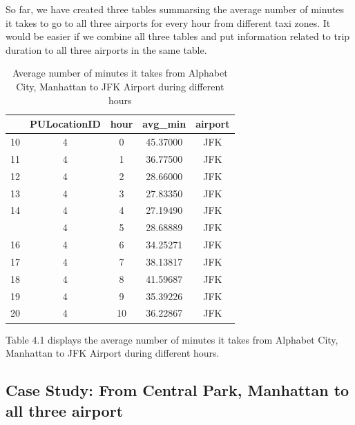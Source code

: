 \documentclass[12pt,twoside]{reedthesis}
\theoremstyle{definition}
\theoremstyle{definition}
\theoremstyle{definition}
\theoremstyle{remark}
\begin{document}
So far, we have created three tables summarsing the average number of
minutes it takes to go to all three airports for every hour from
different taxi zones. It would be easier if we combine all three tables
and put information related to trip duration to all three airports in
the same table.
\begin{table}

\caption{\label{tab:unnamed-chunk-58}Average number of minutes it takes from Alphabet City, Manhattan to JFK Airport during different hours}
\centering
\begin{tabular}[t]{lcccc}
\toprule
  & PULocationID & hour & avg\_min & airport\\
\midrule
10 & 4 & 0 & 45.37000 & JFK\\
11 & 4 & 1 & 36.77500 & JFK\\
12 & 4 & 2 & 28.66000 & JFK\\
13 & 4 & 3 & 27.83350 & JFK\\
14 & 4 & 4 & 27.19490 & JFK\\
\addlinespace
15 & 4 & 5 & 28.68889 & JFK\\
16 & 4 & 6 & 34.25271 & JFK\\
17 & 4 & 7 & 38.13817 & JFK\\
18 & 4 & 8 & 41.59687 & JFK\\
19 & 4 & 9 & 35.39226 & JFK\\
20 & 4 & 10 & 36.22867 & JFK\\
\bottomrule
\end{tabular}
\end{table}
Table 4.1 displays the average number of minutes it takes from Alphabet
City, Manhattan to JFK Airport during different hours.

\subsection{Case Study: From Central Park, Manhattan to all three
airport}\label{case-study-from-central-park-manhattan-to-all-three-airport}
\end{document}
